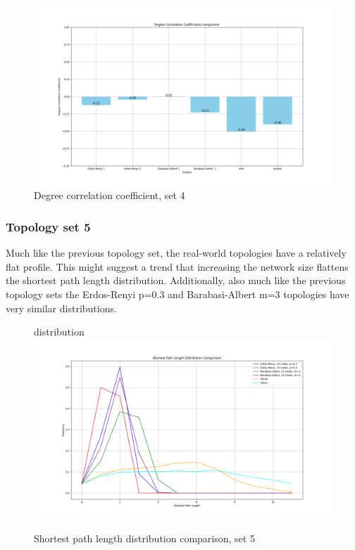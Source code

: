 \begin{figure}
    \centering
    \includegraphics[width=0.9\linewidth]{images/FINAL-TOPO-COMP/Degree-correlation-coeff/deg-coeff-23.png}
    \caption{Degree correlation coefficient, set 4}
    \label{fig:enter-label}
\end{figure}

\subsubsection{Topology set 5}
Much like the previous topology set, the real-world topologies have a relatively flat profile. This might suggest a trend that increasing the network size flattens the shortest path length distribution. Additionally, also much like the previous topology sets the Erdos-Renyi p=0.3 and Barabasi-Albert m=3 topologies have very similar distributions. 
\begin{figure}
    \centering
    distribution \includegraphics[width=0.9\linewidth]{images/FINAL-TOPO-COMP/line-24.png}
    \caption{Shortest path length distribution comparison, set 5}
    \label{fig:enter-label}
\end{figure}

